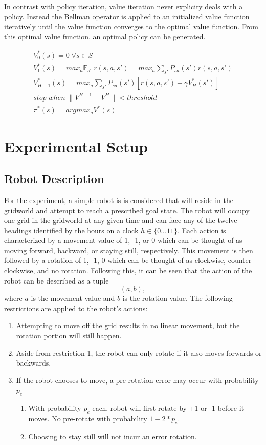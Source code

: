 \documentclass[fullpage]{article}
\begin{document}
In contrast with policy iteration, value iteration never explicity deals with a policy. Instead the Bellman operator is applied to an initialized value function iteratively until the value function converges to the optimal value function. From this optimal value function, an optimal policy can be generated.

\begin{gather}
V_0^*(s) = 0 \; \forall s \in S \\
V_1^*(s) = {max}_a \mathbb{E}_{s'}[r(s, a, s') = {max}_a \sum_{s'} P_{sa}(s') r(s, a, s') \\
V_{H+1}^*(s) = {max}_a \sum_{s'} P_{sa}(s') [r(s, a, s') + \gamma V_H^*(s')] \\
stop \; when \;  \lVert V^{H+1} - V^H \lVert < threshold \\
\pi^*(s) = argmax_a V^*(s)
\end{gather}


\section{Experimental Setup}

\subsection{Robot Description}

For the experiment, a simple robot is is considered that will reside in the gridworld and attempt to reach a prescribed goal state. The robot will occupy one grid in the gridworld at any given time and can face any of the twelve headings identified by the hours on a clock $h \in \{0...11\}$. Each action is characterized by a movement value of 1, -1, or 0 which can be thought of as moving forward, backward, or staying still, respectively. This movement is then followed by a rotation of 1, -1, 0 which can be thought of as clockwise, counter-clockwise, and no rotation. Following this, it can be seen that the action of the robot can be described as a tuple
\[
(a, b),
\]
where $a$ is the movement value and $b$ is the rotation value. The following restrictions are applied to the robot's actions:
\begin{enumerate}
\item Attempting to move off the grid results in no linear movement, but the rotation portion will still happen.
\item Aside from restriction 1, the robot can only rotate if it also moves forwards or backwards.
\item If the robot chooses to move, a pre-rotation error may occur with probability $p_e$
\begin{enumerate}
\item With probability $p_e$ each, robot will first rotate by +1 or -1 before it moves. No pre-rotate with probability $1-2*p_e$.
\item Choosing to stay still will not incur an error rotation.
\end{enumerate}
\end{enumerate}
\end{document}
